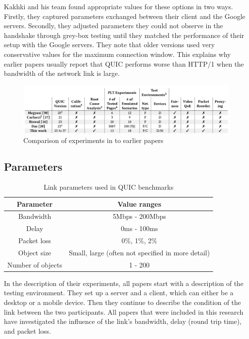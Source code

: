 \documentclass[conference]{IEEEtran}
\begin{document}
Kakhki and his team found appropriate values for these options in two ways. Firstly, they captured parameters exchanged between their client and the Google servers. Secondly, they adjusted parameters they could not observe in the handshake through grey-box testing until they matched the performance of their setup with the Google servers. They note that older versions used very conservative values for the maximum connection window. This explains why earlier papers usually report that QUIC performs worse than HTTP/1 when the bandwidth of the network link is large.

\begin{figure}[t]
\centerline{\includegraphics[width=\textwidth]{images/Kakhki overview.png}}
\caption{Comparison of experiments in \cite{Kakhki} to earlier papers}
\label{fig:Kakhki Comparison}
\end{figure}

\subsection{Parameters}

\begin{table}
\begin{center}
\begin{tabular}{|c|c|}
\hline
\textbf{Parameter} & \textbf{Value ranges} \\
\hline
Bandwidth & 5Mbps - 200Mbps\\
Delay & 0ms - 100ms \\
Packet loss & 0\%, 1\%, 2\% \\
Object size & Small, large (often not specified in more detail) \\
Number of objects & 1 - 200 \\
\hline
\end{tabular}
\end{center}
\caption{Link parameters used in QUIC benchmarks}
\label{fig:quic-parameters}
\end{table}

In the description of their experiments, all papers start with a description of the testing environment. They set up a server and a client, which can either be a desktop or a mobile device. Then they continue to describe the condition of the link between the two participants. All papers that were included in this research have investigated the influence of the link's bandwidth, delay (round trip time), and packet loss. 
\end{document}
